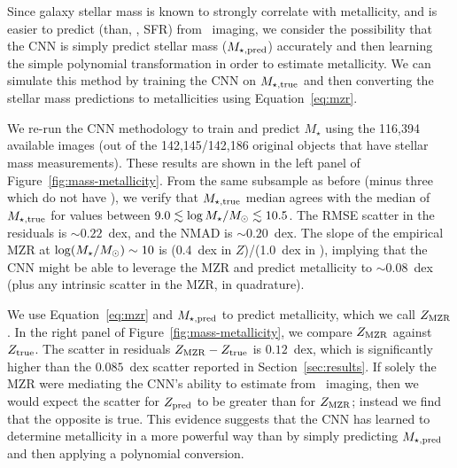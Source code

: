 \documentclass[fleqn,usenatbib]{mnras}
\begin{document}
Since galaxy stellar mass is known to strongly correlate with metallicity, and is easier to predict (than, \eg, SFR) from \sdssg\sdssr\sdssi\ imaging, we consider the possibility that the CNN is simply predict stellar mass ($M_{\star,\rm pred}$) accurately and then learning the simple polynomial transformation in order to estimate metallicity. We can simulate this method by training the CNN on $M_{\star, \rm true}$ and then converting the stellar mass predictions to metallicities using Equation~\ref{eq:mzr}.

We re-run the CNN methodology to train and predict $M_{\star}$ using the 116,394 available images (out of the 142,145/142,186 original objects that have stellar mass measurements). These results are shown in the left panel of Figure~\ref{fig:mass-metallicity}. From the same subsample as before (minus three which do not have \mstar), we verify that $M_{\rm \star, true}$ median agrees with the median of $M_{\rm \star, true}$ for values between $9.0 \lesssim \log \hbox{$M_{\star}$} /\hbox{$M_\odot$} \lesssim 10.5$. The RMSE scatter in the \mstar{} residuals is $\sim 0.22$~dex, and the NMAD is $\sim 0.20$~dex. The slope of the empirical MZR at $\log (\hbox{$M_{\star}$} / \hbox{$M_\odot$}) \sim 10$ is (0.4~dex in $Z$)/(1.0~dex in \mstar), implying that the CNN might be able to leverage the MZR and predict metallicity to $\sim 0.08$~dex (plus any intrinsic scatter in the MZR, in quadrature).


We use Equation~\ref{eq:mzr} and $M_{\star,\rm pred}$ to predict metallicity, which we call $Z_{\rm MZR}$. In the right panel of Figure~\ref{fig:mass-metallicity}, we compare $Z_{\rm MZR}$ against $Z_{\rm true}$. The scatter in residuals $Z_{\rm MZR} - Z_{\rm true}$ is $0.12$~dex, which is significantly higher than the $0.085$~dex scatter reported in Section~\ref{sec:results}.
If solely the MZR were mediating the CNN's ability to estimate from
\sdssg\sdssr\sdssi\ imaging, then we would expect the scatter for $Z_{\rm pred}$ to be greater than for $Z_{\rm MZR}$; instead we find that the opposite is true. This evidence suggests that the CNN has learned to determine metallicity in a more powerful way than by simply predicting $M_{\rm \star,pred}$ and then applying a polynomial conversion.
\end{document}
